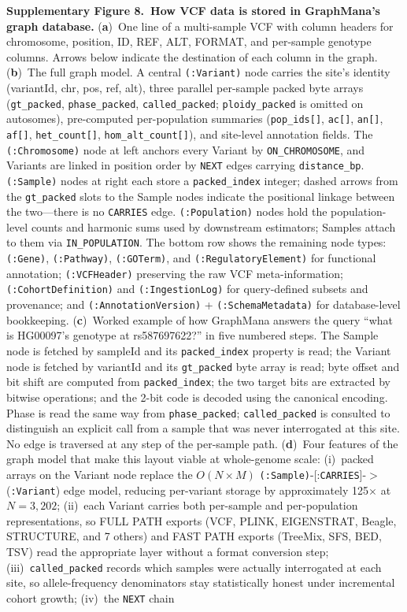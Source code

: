 \documentclass[11pt,a4paper]{article}
\begin{document}
\noindent\textbf{Supplementary Figure 8.~How VCF data is stored in GraphMana's graph database.} (\textbf{a})~One line of a multi-sample VCF with column headers for chromosome, position, ID, REF, ALT, FORMAT, and per-sample genotype columns. Arrows below indicate the destination of each column in the graph. (\textbf{b})~The full graph model. A central \texttt{(:Variant)} node carries the site's identity (variantId, chr, pos, ref, alt), three parallel per-sample packed byte arrays (\texttt{gt\_packed}, \texttt{phase\_packed}, \texttt{called\_packed}; \texttt{ploidy\_packed} is omitted on autosomes), pre-computed per-population summaries (\texttt{pop\_ids[]}, \texttt{ac[]}, \texttt{an[]}, \texttt{af[]}, \texttt{het\_count[]}, \texttt{hom\_alt\_count[]}), and site-level annotation fields. The \texttt{(:Chromosome)} node at left anchors every Variant by \texttt{ON\_CHROMOSOME}, and Variants are linked in position order by \texttt{NEXT} edges carrying \texttt{distance\_bp}. \texttt{(:Sample)} nodes at right each store a \texttt{packed\_index} integer; dashed arrows from the \texttt{gt\_packed} slots to the Sample nodes indicate the positional linkage between the two---there is no \texttt{CARRIES} edge. \texttt{(:Population)} nodes hold the population-level counts and harmonic sums used by downstream estimators; Samples attach to them via \texttt{IN\_POPULATION}. The bottom row shows the remaining node types: \texttt{(:Gene)}, \texttt{(:Pathway)}, \texttt{(:GOTerm)}, and \texttt{(:RegulatoryElement)} for functional annotation; \texttt{(:VCFHeader)} preserving the raw VCF meta-information; \texttt{(:CohortDefinition)} and \texttt{(:IngestionLog)} for query-defined subsets and provenance; and \texttt{(:AnnotationVersion)} + \texttt{(:SchemaMetadata)} for database-level bookkeeping. (\textbf{c})~Worked example of how GraphMana answers the query ``what is HG00097's genotype at rs587697622?'' in five numbered steps. The Sample node is fetched by sampleId and its \texttt{packed\_index} property is read; the Variant node is fetched by variantId and its \texttt{gt\_packed} byte array is read; byte offset and bit shift are computed from \texttt{packed\_index}; the two target bits are extracted by bitwise operations; and the 2-bit code is decoded using the canonical encoding. Phase is read the same way from \texttt{phase\_packed}; \texttt{called\_packed} is consulted to distinguish an explicit call from a sample that was never interrogated at this site. No edge is traversed at any step of the per-sample path. (\textbf{d})~Four features of the graph model that make this layout viable at whole-genome scale: (i)~packed arrays on the Variant node replace the $O(N{\times}M)$ \texttt{(:Sample)}-[:\texttt{CARRIES}]-$>$(\texttt{:Variant}) edge model, reducing per-variant storage by approximately 125$\times$ at $N{=}3{,}202$; (ii)~each Variant carries both per-sample and per-population representations, so FULL PATH exports (VCF, PLINK, EIGENSTRAT, Beagle, STRUCTURE, and 7 others) and FAST PATH exports (TreeMix, SFS, BED, TSV) read the appropriate layer without a format conversion step; (iii)~\texttt{called\_packed} records which samples were actually interrogated at each site, so allele-frequency denominators stay statistically honest under incremental cohort growth; (iv)~the \texttt{NEXT} chain 
\end{document}
